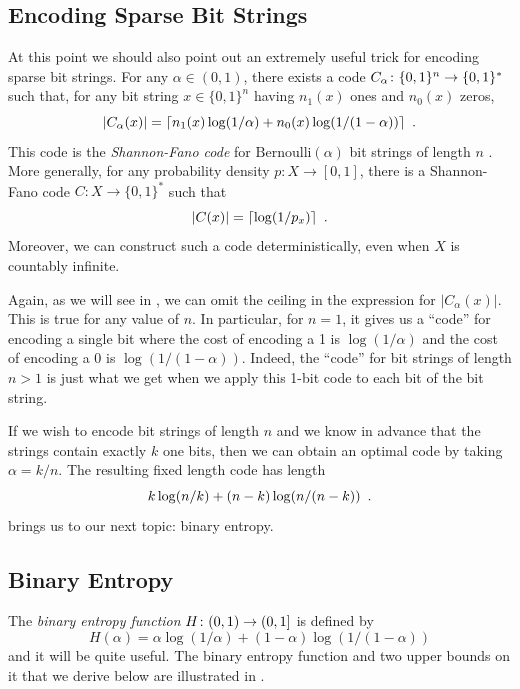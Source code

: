 \documentclass[prodmode,acmcsur]{acmsmall}
\begin{document}
\subsection{Encoding Sparse Bit Strings}

At this point we should also point out an extremely useful trick 
for encoding sparse bit strings. For any $\alpha\in(0,1)$,
there exists a code $C_\alpha\colon \{0,1\}^n\rightarrow \{0,1\}^*$
such that, for any bit string $x\in\{0,1\}^n$ having $n_1(x)$ ones and
$n_0(x)$ zeros,
\begin{equation}
  |C_\alpha(x)| = \lceil n_1(x)\log(1/\alpha) + n_0(x)\log(1/(1-\alpha)) \rceil \enspace .
  \eqlabel{sparse-bitstring-i}
\end{equation}
This code is the \emph{Shannon-Fano code}
for $\mathrm{Bernoulli}(\alpha)$ bit strings of length $n$
\cite{fano:transmission,shannon:mathematical}. 
More generally, for any probability density $p : X \to [0, 1]$,
there is a Shannon-Fano code $C : X \to \{0, 1\}^*$ 
such that
\[
  |C(x)| = {\lceil \log (1/p_x) \rceil} \enspace .
\]
Moreover, we can construct such a code deterministically, even when
$X$ is countably infinite.

Again, as we will see in , we can omit the ceiling in the
expression for $|C_\alpha(x)|$.  This is true for any value of $n$. In
particular, for $n=1$, it gives us a ``code'' for encoding a single
bit where the cost of encoding a 1 is $\log(1/\alpha)$ and the cost of
encoding a 0 is $\log(1/(1-\alpha))$.  Indeed, the ``code'' for bit
strings of length $n>1$ is just what we get when we apply this 1-bit
code to each bit of the bit string.

If we wish to encode bit strings of length $n$ and we know in advance
that the strings contain exactly $k$ one bits, then we can obtain
an optimal code 
by taking $\alpha=k/n$. The resulting fixed length
code has length
\begin{equation}
  k\log (n/k) + (n-k)\log(n/(n-k))  \eqlabel{sparse-bitstring-ii} \enspace .
\end{equation}
 brings us to our next topic: binary entropy.

\subsection{Binary Entropy}

The \emph{binary entropy function} $H\colon (0,1)\to(0,1]$ is defined
by
\[
  H(\alpha) = \alpha\log(1/\alpha) + (1-\alpha)\log(1/(1-\alpha)) 
\]
and it will be quite useful.  The binary entropy function and two upper
bounds on it that we derive below are illustrated in .
\end{document}
